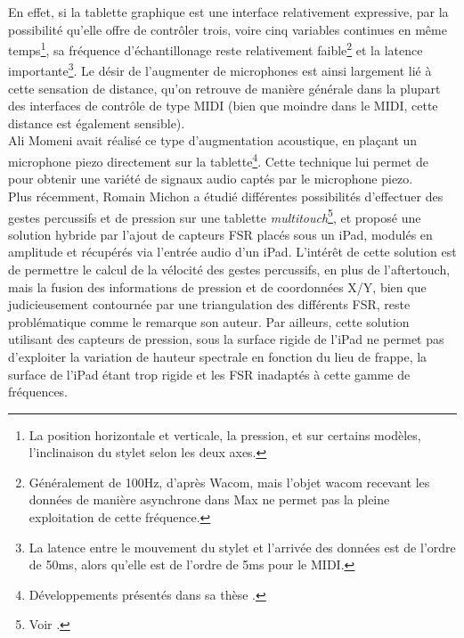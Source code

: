 \noindent En effet, si la tablette graphique est une interface relativement expressive, par la possibilité qu'elle offre de contrôler trois, voire cinq variables continues en même temps\footnote{La position horizontale et verticale, la pression, et sur certains modèles, l'inclinaison du stylet selon les deux axes.}, sa fréquence d'échantillonage reste relativement faible\footnote{Généralement de 100Hz, d'après Wacom, mais l'objet wacom recevant les données de manière asynchrone dans Max ne permet pas la pleine exploitation de cette fréquence.} et la latence importante\footnote{La latence entre le mouvement du stylet et l'arrivée des données est de l'ordre de 50ms, alors qu'elle est de l'ordre de 5ms pour le \gls{MIDI}.}. Le désir de l'augmenter de microphones est ainsi largement lié à cette sensation de distance, qu'on retrouve de manière générale dans la plupart des interfaces de contrôle de type \gls{MIDI} (bien que moindre dans le \gls{MIDI}, cette distance est également sensible).\\
\indent Ali Momeni avait réalisé ce type d'augmentation acoustique, en plaçant un microphone piezo directement sur la tablette\footnote{Développements présentés dans sa thèse \cite{momeni_composing_2005}.}. Cette technique lui permet de  pour obtenir une variété de signaux audio captés par le microphone piezo.\\
\indent Plus récemment, Romain Michon a étudié différentes possibilités d'effectuer des gestes percussifs et de pression sur une tablette \textit{multitouch}\footnote{Voir \cite{michon_nuance_2016}.}, et proposé une solution hybride par l'ajout de capteurs \gls{FSR} placés sous un iPad, modulés en amplitude et récupérés via l'entrée audio d'un iPad. L'intérêt de cette solution est de permettre le calcul de la vélocité des gestes percussifs, en plus de l'aftertouch, mais la fusion des informations de pression et de coordonnées X/Y, bien que judicieusement contournée par une triangulation des différents \gls{FSR}, reste problématique comme le remarque son auteur. Par ailleurs, cette solution utilisant des capteurs de pression, sous la surface rigide de l'iPad ne permet pas d'exploiter la variation de hauteur spectrale en fonction du lieu de frappe, la surface de l'iPad étant trop rigide et les \gls{FSR} inadaptés à cette gamme de fréquences.\\
